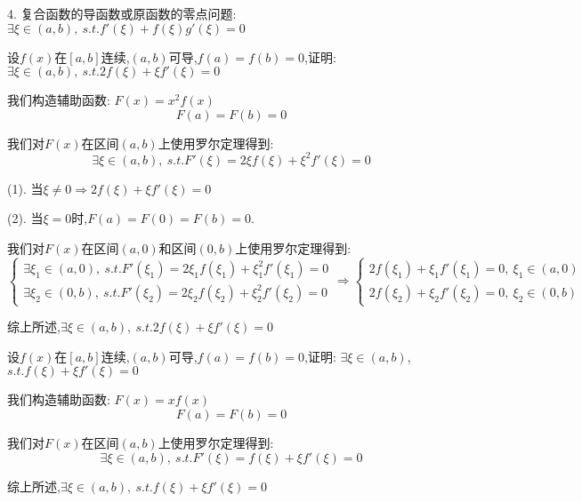 4. 复合函数的导函数或原函数的零点问题: $\exists\xi\in(a,b),\ s.t. f'(\xi)+f(\xi)g'(\xi)=0$
\begin{proposition}
	设$f(x)$在$[a,b]$连续,$(a,b)$可导,$f(a)=f(b)=0$,证明: $\exists \xi\in(a,b),\ s.t. 2f(\xi)+\xi f'(\xi)=0$
\end{proposition}
\begin{solution}

	我们构造辅助函数:  $F(x)=x^2f(x)$
	$$F(a)=F(b)=0$$

	我们对$F(x)$在区间$(a,b)$上使用罗尔定理得到:
	$$\exists \xi\in(a,b),\ s.t. F'(\xi)=2\xi f(\xi)+\xi^2f'(\xi)=0$$

	(1). 当$\xi\neq 0\Rightarrow 2f(\xi)+\xi f'(\xi)=0$

	(2). 当$\xi=0$时,$F(a)=F(0)=F(b)=0$.

	我们对$F(x)$在区间$(a,0)$和区间$(0,b)$上使用罗尔定理得到:
	$$\left\lbrace
		\begin{array}{l}
			\exists \xi_{1}\in(a,0),\ s.t. F'(\xi_{1})=2\xi_{1} f(\xi_{1})+\xi_{1}^2f'(\xi_{1})=0 \\
			\exists \xi_{2}\in(0,b),\ s.t. F'(\xi_{2})=2\xi_{2} f(\xi_{2})+\xi_{2}^2f'(\xi_{2})=0
		\end{array}
		\right. \Rightarrow\left\lbrace
		\begin{array}{l}
			2f(\xi_{1})+\xi_{1}f'(\xi_{1})=0,\ \xi_{1}\in(a,0) \\
			2f(\xi_{2})+\xi_{2}f'(\xi_{2})=0,\ \xi_{2}\in(0,b)
		\end{array}
		\right. $$

	综上所述,$\exists \xi\in(a,b),\ s.t. 2f(\xi)+\xi f'(\xi)=0$
\end{solution}


\begin{proposition}
	设$f(x)$在$[a,b]$连续,$(a,b)$可导,$f(a)=f(b)=0$,证明: $\exists \xi\in(a,b)$, $s.t. f(\xi)+\xi f'(\xi)=0$
\end{proposition}
\begin{solution}

	我们构造辅助函数:  $F(x)=xf(x)$
	$$F(a)=F(b)=0$$

	我们对$F(x)$在区间$(a,b)$上使用罗尔定理得到:
	$$\exists \xi\in(a,b),\ s.t. F'(\xi)= f(\xi)+\xi f'(\xi)=0$$

	综上所述,$\exists \xi\in(a,b),\ s.t. f(\xi)+\xi f'(\xi)=0$
\end{solution}


